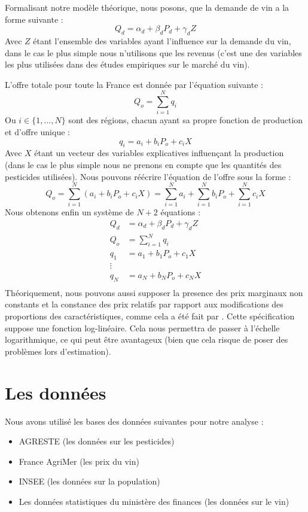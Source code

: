 \documentclass[11pt, a4paper]{article}
\begin{document}
Formalisant notre modèle théorique, nous posons, que la demande de vin a la forme suivante :
\begin{equation}
    Q_d = \alpha_d + \beta_d P_d + \gamma_d Z 
\end{equation}
Avec $Z$ étant l'ensemble des variables ayant l'influence sur la demande du vin, dans le cas le plus simple nous n'utilisons que les revenus (c'est une des variables les plus utilisées dans des études empiriques sur le marché du vin).
\par
L'offre totale pour toute la France est donnée par l'équation suivante : 
\begin{equation}
    Q_o = \sum_{i = 1}^{N} q_i
\end{equation}
Ou $i \in \{1, ..., N\}$ sont des régions, chacun ayant sa propre fonction de production et d'offre unique : 
\begin{equation}
    q_i = a_i + b_i P_o + c_i X
\end{equation}
Avec $X$ étant un vecteur des variables explicatives influençant la production (dans le cas le plus simple nous ne prenons en compte que les quantités des pesticides utilisées).
Nous pouvons réécrire l'équation de l'offre sous la forme :
\begin{equation}
    Q_o = \sum_{i = 1}^{N} (a_i + b_i P_o + c_i X) = \sum_{i = 1}^{N} a_i + \sum_{i = 1}^{N} b_i P_o + \sum_{i = 1}^{N} c_i X
\end{equation}
Nous obtenons enfin un système de $N + 2$ équations : 
\begin{align*}
    Q_d & = \alpha_d + \beta_d P_d + \gamma_d Z \\
    Q_o & = \sum_{i = 1}^{N} q_i \\
    q_1 & = a_1 + b_1 P_o + c_1 X \\ 
    \vdots \\ 
    q_N & = a_N + b_N P_o + c_N X \\
\end{align*}
Théoriquement, nous pouvons aussi supposer la presence des prix marginaux non constants et la constance des prix relatifs par rapport aux modifications des proportions des caractéristiques, comme cela a été fait par \citet{steiner2004}. 
Cette spécification suppose une fonction log-linéaire. 
Cela nous permettra de passer à l'échelle logarithmique, ce qui peut être avantageux (bien que cela risque de poser des problèmes lors d'estimation).

\section*{Les données}
Nous avons utilisé les bases des données suivantes pour notre analyse :
\begin{itemize}
    \item AGRESTE (les données sur les pesticides)
    \item France AgriMer (les prix du vin)
    \item INSEE (les données sur la population)
    \item Les données statistiques du ministère des finances (les données sur le vin)
\end{itemize}
\end{document}
